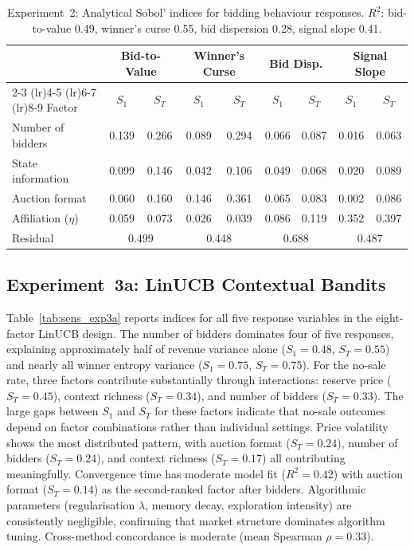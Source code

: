 \begin{table}[H]
\centering
\caption{Experiment~2: Analytical Sobol' indices for bidding behaviour responses. $R^2$: bid-to-value 0.49, winner's curse 0.55, bid dispersion 0.28, signal slope 0.41.}
\label{tab:sens_exp2b}
\small
\begin{tabular}{l cc cc cc cc}
\toprule
& \multicolumn{2}{c}{Bid-to-Value} & \multicolumn{2}{c}{Winner's Curse} & \multicolumn{2}{c}{Bid Disp.} & \multicolumn{2}{c}{Signal Slope} \\
\cmidrule(lr){2-3} \cmidrule(lr){4-5} \cmidrule(lr){6-7} \cmidrule(lr){8-9}
Factor & $S_1$ & $S_T$ & $S_1$ & $S_T$ & $S_1$ & $S_T$ & $S_1$ & $S_T$ \\
\midrule
Number of bidders     & 0.139 & 0.266 & 0.089 & 0.294 & 0.066 & 0.087 & 0.016 & 0.063 \\
State information     & 0.099 & 0.146 & 0.042 & 0.106 & 0.049 & 0.068 & 0.020 & 0.089 \\
Auction format        & 0.060 & 0.160 & 0.146 & 0.361 & 0.065 & 0.083 & 0.002 & 0.086 \\
Affiliation ($\eta$)  & 0.059 & 0.073 & 0.026 & 0.039 & 0.086 & 0.119 & 0.352 & 0.397 \\
\midrule
Residual              & \multicolumn{2}{c}{0.499} & \multicolumn{2}{c}{0.448} & \multicolumn{2}{c}{0.688} & \multicolumn{2}{c}{0.487} \\
\bottomrule
\end{tabular}
\end{table}

\subsection{Experiment~3a: LinUCB Contextual Bandits}
\label{sec:sens_exp3a}

Table~\ref{tab:sens_exp3a} reports indices for all five response variables in the eight-factor LinUCB design. The number of bidders dominates four of five responses, explaining approximately half of revenue variance alone ($S_1 = 0.48$, $S_T = 0.55$) and nearly all winner entropy variance ($S_1 = 0.75$, $S_T = 0.75$). For the no-sale rate, three factors contribute substantially through interactions: reserve price ($S_T = 0.45$), context richness ($S_T = 0.34$), and number of bidders ($S_T = 0.33$). The large gaps between $S_1$ and $S_T$ for these factors indicate that no-sale outcomes depend on factor combinations rather than individual settings. Price volatility shows the most distributed pattern, with auction format ($S_T = 0.24$), number of bidders ($S_T = 0.24$), and context richness ($S_T = 0.17$) all contributing meaningfully. Convergence time has moderate model fit ($R^2 = 0.42$) with auction format ($S_T = 0.14$) as the second-ranked factor after bidders. Algorithmic parameters (regularisation $\lambda$, memory decay, exploration intensity) are consistently negligible, confirming that market structure dominates algorithm tuning. Cross-method concordance is moderate (mean Spearman $\rho = 0.33$).

